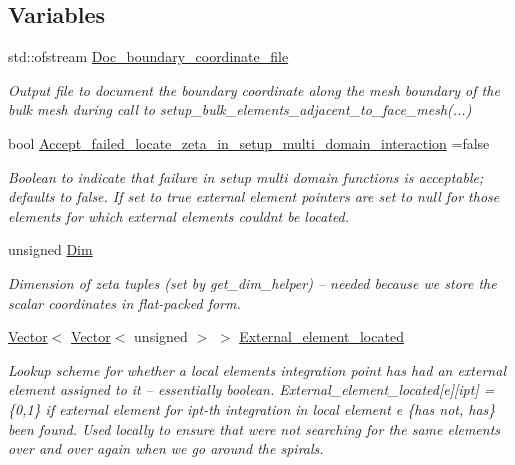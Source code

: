 \subsection*{Variables}
\begin{DoxyCompactItemize}
\item 
std\+::ofstream \hyperlink{namespaceoomph_1_1Multi__domain__functions_a87a54c04fcc68b716adf10ca29a1f449}{Doc\+\_\+boundary\+\_\+coordinate\+\_\+file}
\begin{DoxyCompactList}\small\item\em Output file to document the boundary coordinate along the mesh boundary of the bulk mesh during call to setup\+\_\+bulk\+\_\+elements\+\_\+adjacent\+\_\+to\+\_\+face\+\_\+mesh(...) \end{DoxyCompactList}\item 
bool \hyperlink{namespaceoomph_1_1Multi__domain__functions_af4e0a3d3191c370209c6a7830a0dc368}{Accept\+\_\+failed\+\_\+locate\+\_\+zeta\+\_\+in\+\_\+setup\+\_\+multi\+\_\+domain\+\_\+interaction} =false
\begin{DoxyCompactList}\small\item\em Boolean to indicate that failure in setup multi domain functions is acceptable; defaults to false. If set to true external element pointers are set to null for those elements for which external elements couldn\textquotesingle{}t be located. \end{DoxyCompactList}\item 
unsigned \hyperlink{namespaceoomph_1_1Multi__domain__functions_a27cbb5ec7f6fea2f237c11659ffeef58}{Dim}
\begin{DoxyCompactList}\small\item\em Dimension of zeta tuples (set by get\+\_\+dim\+\_\+helper) -- needed because we store the scalar coordinates in flat-\/packed form. \end{DoxyCompactList}\item 
\hyperlink{classoomph_1_1Vector}{Vector}$<$ \hyperlink{classoomph_1_1Vector}{Vector}$<$ unsigned $>$ $>$ \hyperlink{namespaceoomph_1_1Multi__domain__functions_a2325d66c90ff388dfd6b2649a48e9827}{External\+\_\+element\+\_\+located}
\begin{DoxyCompactList}\small\item\em Lookup scheme for whether a local element\textquotesingle{}s integration point has had an external element assigned to it -- essentially boolean. External\+\_\+element\+\_\+located\mbox{[}e\mbox{]}\mbox{[}ipt\mbox{]} = \{0,1\} if external element for ipt-\/th integration in local element e \{has not, has\} been found. Used locally to ensure that we\textquotesingle{}re not searching for the same elements over and over again when we go around the spirals. \end{DoxyCompactList}\item 

\end{DoxyCompactItemize}

